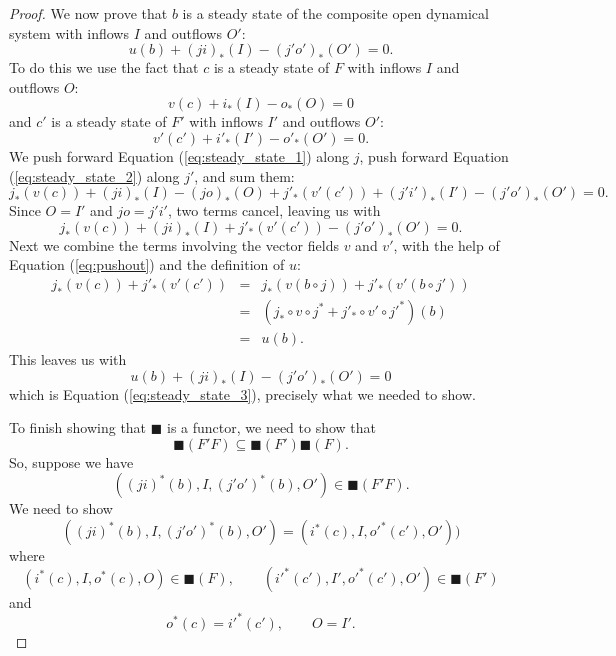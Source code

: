 \documentclass{compositionalityarticle}
\theoremstyle{plain}
\theoremstyle{remark}
\begin{document}
\begin{proof}
We now prove that $b$ is a steady state of the composite open dynamical system with
inflows $I$ and outflows $O'$:
\begin{equation}
\label{eq:steady_state_3}
   u(b) + (ji)_*(I) - (j'o')_*(O') = 0.
\end{equation}
To do this we use the fact that $c$ is a steady state of $F$ with inflows $I$ and outflows $O$:
\begin{equation}
\label{eq:steady_state_1}
   v(c) + i_*(I) - {o}_*(O) = 0
\end{equation}
and $c'$ is a steady state of $F'$ with inflows $I'$ and outflows $O'$:
\begin{equation}
\label{eq:steady_state_2}
   v'(c') + {i'}_*(I') - {o'}_*(O') = 0.
\end{equation}
We push forward Equation (\ref{eq:steady_state_1}) along $j$, push forward Equation
(\ref{eq:steady_state_2}) along $j'$, and sum them:
\[   j_*(v(c))  + (ji)_*(I) - (jo)_*(O) + j'_*(v'(c')) + (j'i')_*(I') - (j'o')_*(O') = 0. \]
Since $O = I'$ and $jo = j'i'$, two terms cancel, leaving us with
\[     j_*(v(c))  + (ji)_*(I) + j'_*(v'(c')) - (j'o')_*(O') = 0. \]
Next we combine the terms involving the vector fields $v$ and $v'$, with the help of Equation (\ref{eq:pushout}) and the definition of $u$:
\begin{equation}
\label{eq:u}
   \begin{array}{ccl}
  j_*(v(c)) + j'_*(v'(c')) &=& j_*(v(b \circ j)) + j'_*(v'(b \circ j')) \\
                                    &=& (j_* \circ v \circ j^* + j'_* \circ v' \circ j'^*)(b) \\
                                    &=& u(b)  .
\end{array}
\end{equation}
This leaves us with
\[         u(b) +  (ji)_*(I) - (j'o')_*(O') = 0 \]
which is Equation (\ref{eq:steady_state_3}), precisely what we needed to show.

To finish showing that $\blacksquare$ is a functor, we need to show that 
\[   \blacksquare(F'F) \subseteq \blacksquare(F') \blacksquare(F)  .\] 
So, suppose we have 
\[    ((ji)^*(b), I, {(j'o')}^*(b), O') \in \blacksquare(F'F) .\]
We need to show
\begin{equation}
\label{eq:composite}
  ((ji)^*(b), I, {(j'o')}^*(b), O') = (i^*(c),I,{o'}^*(c'),O')) 
\end{equation}
where 
\[     (i^*(c),I,o^*(c),O) \in \blacksquare(F), \qquad  ({i'}^*(c'),I',{o'}^*(c'),O') \in \blacksquare(F') \]
and
\[   o^*(c) = {i'}^*(c'), \qquad O = I' .\]


\end{proof}
\end{document}
